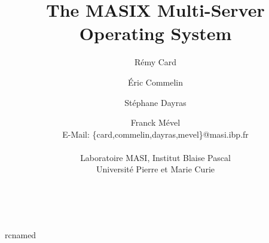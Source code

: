%
%


	\raggedbottom

%
%

\newcommand {\code} [1]
	{\begin {quote}
		\tt
		\begin {tabbing}
			#1
		\end {tabbing}
	 \end {quote}
	}
\newcommand {\cindent} {\hspace* {10mm} \=}

%
%

\newcommand {\todo} [1]
	{\begin {center}
		\Large {A faire: #1}
	 \end {center}
	 \addcontentsline {toc} {subsubsection} {A faire: #1}
	}

%
%

\newcommand {\changementdebut}
	{\marginpar {\rule [2pt] {10mm} {1mm} $\bigtriangledown$}}
\newcommand {\changementfin}
	{\marginpar {\rule {10mm} {1mm} $\bigtriangleup$}}

%
%


	 {rcnamed}

\title {The MASIX Multi-Server Operating System}
\author {R\'emy Card \and \'Eric Commelin \and St\'ephane Dayras
	 \and Franck M\'evel \\
	 E-Mail: \{card,commelin,dayras,mevel\}@masi.ibp.fr \\ \\
	Laboratoire MASI, Institut Blaise Pascal \\
	Universit\'e Pierre et Marie Curie
}
\date { ~ }
\maketitle

